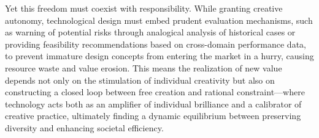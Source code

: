 Yet this freedom must coexist with responsibility\cite{smits2019values, rigaud2022exploring}. While granting creative autonomy, technological design must embed prudent evaluation mechanisms, such as warning of potential risks through analogical analysis of historical cases\cite{thomas2013extending} or providing feasibility recommendations based on cross-domain performance data\cite{andriani2025perfume}, to prevent immature design concepts from entering the market in a hurry, causing resource waste and value erosion. This means the realization of new value depends not only on the stimulation of individual creativity but also on constructing a closed loop between free creation and rational constraint—where technology acts both as an amplifier of individual brilliance and a calibrator of creative practice, ultimately finding a dynamic equilibrium between preserving diversity and enhancing societal efficiency.




